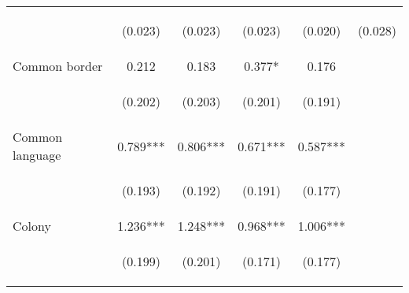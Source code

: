 \documentclass[twoside,a4paper,11pt]{article}
\begin{document}
\begin{table}[t]
{\begin{tabular}{lccccc}
	\vspace{4pt} & \begin{footnotesize}(0.023)\end{footnotesize} & \begin{footnotesize}(0.023)\end{footnotesize} & \begin{footnotesize}(0.023)\end{footnotesize} & \begin{footnotesize}(0.020)\end{footnotesize} & \begin{footnotesize}(0.028)\end{footnotesize} \\
	Common border & 0.212 & 0.183 & 0.377* & 0.176 &  \\
	\vspace{4pt} & \begin{footnotesize}(0.202)\end{footnotesize} & \begin{footnotesize}(0.203)\end{footnotesize} & \begin{footnotesize}(0.201)\end{footnotesize} & \begin{footnotesize}(0.191)\end{footnotesize} & \begin{footnotesize}\end{footnotesize} \\
	Common language & 0.789*** & 0.806*** & 0.671*** & 0.587*** &  \\
	\vspace{4pt} & \begin{footnotesize}(0.193)\end{footnotesize} & \begin{footnotesize}(0.192)\end{footnotesize} & \begin{footnotesize}(0.191)\end{footnotesize} & \begin{footnotesize}(0.177)\end{footnotesize} & \begin{footnotesize}\end{footnotesize} \\
	Colony & 1.236*** & 1.248*** & 0.968*** & 1.006*** &  \\
	\vspace{4pt} & \begin{footnotesize}(0.199)\end{footnotesize} & \begin{footnotesize}(0.201)\end{footnotesize} & \begin{footnotesize}(0.171)\end{footnotesize} & \begin{footnotesize}(0.177)\end{footnotesize} & \begin{footnotesize}\end{footnotesize} \\

\end{tabular}}
\end{table}
\end{document}
